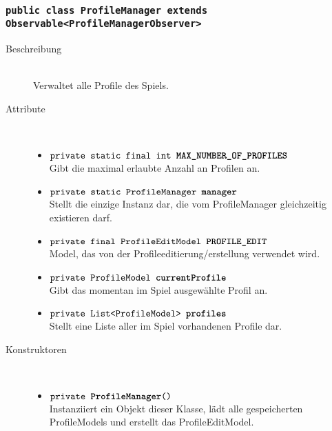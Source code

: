 \subsubsection{\normalfont \texttt{public class \textbf{ProfileManager} extends Observable<ProfileManagerObserver>}}

\begin{description}
\item[Beschreibung] \hfill \\ Verwaltet alle Profile des Spiels.

\item[Attribute] \hfill \\
	\vspace{-.8cm}
	\begin{itemize}
		\item $\texttt{private static final int \textbf{MAX\_NUMBER\_OF\_PROFILES}}$ \\ Gibt die maximal erlaubte Anzahl an Profilen an.
		\item $\texttt{private static ProfileManager \textbf{manager}}$ \\ Stellt die einzige Instanz dar, die vom ProfileManager gleichzeitig existieren darf.
		\item $\texttt{private final ProfileEditModel \textbf{PROFILE\_EDIT}}$ \\ Model, das von der Profileeditierung/erstellung verwendet wird. 
		\item $\texttt{private ProfileModel \textbf{currentProfile}}$ \\ Gibt das momentan im Spiel ausgewählte Profil an.
		\item $\texttt{private List<ProfileModel> \textbf{profiles}}$ \\ Stellt eine Liste aller im Spiel vorhandenen Profile dar.
	\end{itemize}
	
\item[Konstruktoren] \hfill \\
	\vspace{-.8cm}
	\begin{itemize}
		\item $\texttt{private \textbf{ProfileManager}()}$ \\ Instanziiert ein Objekt dieser Klasse, lädt alle gespeicherten ProfileModels und erstellt das ProfileEditModel.
	\end{itemize}
	

\end{description}
